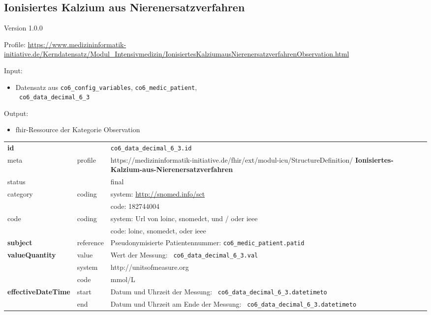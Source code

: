 \subsection{Ionisiertes Kalzium aus Nierenersatzverfahren} 
\noindent Version 1.0.0

\noindent Profile: \url{https://www.medizininformatik-initiative.de/Kerndatensatz/Modul_Intensivmedizin/IonisiertesKalziumausNierenersatzverfahrenObservation.html}

\noindent Input:
\begin{itemize}
	\item Datensatz aus \texttt{co6\_config\_variables}, \texttt{co6\_medic\_patient}, \\ \texttt{
co6\_data\_decimal\_6\_3}
\end{itemize}
Output:
\begin{itemize}
        \item \ac{fhir}-Ressource der Kategorie \glqq Observation\grqq{}
\end{itemize}
\begin{longtable}{|l|l|p{7.5cm}|}
        \hline
        \rowcolor{lightgray} \multicolumn{3}{|l|}{Data Mapping (inhaltlich)} \\ \hline
        \textbf{id} &  & \texttt{co6\_data\_decimal\_6\_3.id} \\ \hline
	meta & profile & https://medizininformatik-initiative.de/fhir/ext/modul-icu/StructureDefinition/\textbf{
Ionisiertes-Kalzium-aus-Nierenersatzverfahren} \\ \hline 
	status &  & final   \\ \hline 
	category & coding & system: \url{http://snomed.info/sct} \\
\cline{3-3}
	& & code: 182744004 \\ \hline
	code & coding & system: Url von \ac{loinc}, \ac{snomedct}, und / oder \ac{ieee} \\ 
	\cline{3-3} 
	 &  & code: \ac{loinc}, \ac{snomedct}, oder \ac{ieee} \\ \hline
	 \textbf{subject}  & reference & Pseudonymisierte Patientennummer: \texttt{co6\_medic\_patient.patid} \\ \hline
	 \textbf{valueQuantity}  & value & Wert der Messung: \texttt{
co6\_data\_decimal\_6\_3.val} \\
        \cline{2-3}
         & system & http://unitsofmeasure.org \\
         \cline{2-3}
         & code & mmol/L \\ \hline
     \textbf{effectiveDateTime}  & start & Datum und Uhrzeit der Messung: \texttt{
co6\_data\_decimal\_6\_3.datetimeto} \\
    \cline{2-3}
     & end & Datum und Uhrzeit am Ende der Messung: \texttt{
co6\_data\_decimal\_6\_3.datetimeto} \\ \hline
\end{longtable}


